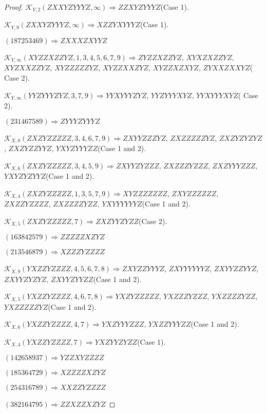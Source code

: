 \documentclass[12pt]{article}
\theoremstyle{plain}
\theoremstyle{definition}
\theoremstyle{remark}
\newcommand{\fancy}[1]{\mathcal{#1}}
\def\K{\fancy{K}}
\begin{document}
\begin{proof}
	$\K_{Y,2}(ZXXYZYYYZ,\infty)\Rightarrow $$ZZXYZYYYZ$(Case 1).
	
	$\K_{Y,9}(ZXXYZYYYZ,\infty)\Rightarrow $$XZZYXYYYZ$(Case 1).
	
	
	
	$(1 8 7 2 5 3 4 6 9)\Rightarrow ZXXXZXYYZ$
	
	
	
	$\K_{Y,\infty}(XYZZXZZYZ,1, 3, 4, 5, 6, 7, 9)\Rightarrow $$ZYZZXZZYZ$, $XYXZXZZYZ$, $XYZXXZZYZ$, $XYZZZZZYZ$, $XYZZXXZYZ$, $XYZZXZXYZ$, $ZYXXZXXYZ$( Case 2).
	
	$\K_{Y,\infty}(YYZYYYZYZ,3, 7, 9)\Rightarrow $$YYXYYYZYZ$, $YYZYYYXYZ$, $YYXYYYXYZ$( Case 2).
	
	
	
	$(2 3 1 4 6 7 5 8 9)\Rightarrow ZYYYZYYYZ$
	
	
	
	$\K_{X,8}(ZXZYZZZZZ,3, 4, 6, 7, 9)\Rightarrow $$ZXYYZZZYZ$, $ZXZZZZZYZ$, $ZXZYZYZYZ$, $ZXZYZZYYZ$, $YXYZYYYZZ$(Case 1 and 2).
	
	$\K_{X,6}(ZXZYZZZZZ,3, 4, 5, 9)\Rightarrow $$ZXYYZYZZZ$, $ZXZZZYZZZ$, $ZXZYYYZZZ$, $YXYZYZYYZ$(Case 1 and 2).
	
	$\K_{X,4}(ZXZYZZZZZ,1, 3, 5, 7, 9)\Rightarrow $$XYZZZZZZZ$, $ZXYZZZZZZ$, $ZXZZYZZZZ$, $ZXZZZZYZZ$, $YXYYYYYYZ$(Case 1 and 2).
	
	$\K_{X,5}(ZXZYZZZZZ,7)\Rightarrow $$ZXZYYZYZZ$(Case 2).
	
	
	
	$(1 6 3 8 4 2 5 7 9)\Rightarrow ZZZZZXZYZ$
	
	$(2 1 3 5 4 6 8 7 9)\Rightarrow XZZZYZZZZ$
	
	
	
	$\K_{X,9}(YXZZYZZZZ,4, 5, 6, 7, 8)\Rightarrow $$ZXYZZYYYZ$, $ZXYYYYYYZ$, $ZXYYZZYYZ$, $ZXYYZYZYZ$, $ZXYYZYYZZ$(Case 1 and 2).
	
	$\K_{X,5}(YXZZYZZZZ,4, 6, 7, 8)\Rightarrow $$YXZYZZZZZ$, $YXZZZYZZZ$, $YXZZZZYZZ$, $YXZZZZZYZ$(Case 1 and 2).
	
	$\K_{X,6}(YXZZYZZZZ,4, 7)\Rightarrow $$YXZYYYZZZ$, $YXZZYYYZZ$(Case 1 and 2).
	
	$\K_{X,4}(YXZZYZZZZ,7)\Rightarrow $$YXZYYZYZZ$(Case 1).
	
	
	
	$(1 4 2 6 5 8 9 3 7)\Rightarrow YZZXYZZZZ$
	
	$(1 8 5 3 6 4 7 2 9)\Rightarrow XZZZZXZYZ$
	
	$(2 5 4 3 1 6 7 8 9)\Rightarrow XXZZYZZZZ$
	
	$(3 8 2 1 6 4 7 9 5)\Rightarrow ZZXZZXZYZ$
	

\end{proof}
\end{document}
